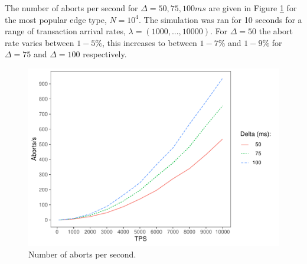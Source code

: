 The number of aborts per second for $\Delta = 50, 75, 100ms$ are given in Figure \ref{aborts-results} for the most popular edge type, $N=10^4$. The simulation was ran for 10 seconds for a range of transaction arrival rates, $\lambda = (1000, ..., 10000)$. For $\Delta = 50$ the abort rate varies between $1-5\%$, this increases to between $1-7\%$ and $1-9\%$ for $\Delta = 75$ and $\Delta = 100$ respectively.

\begin{figure}[h]
  \centering
  \includegraphics[width=\linewidth]{./figures/aborts}
  \caption{Number of aborts per second.}
  \label{aborts-results}
\end{figure}
